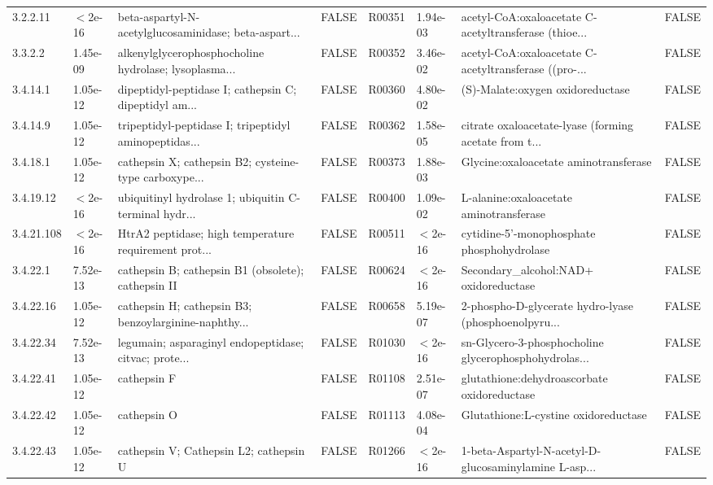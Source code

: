 \documentclass{article}\usepackage[]{graphicx}\usepackage[]{color}
\begin{document}
{{\begin{tabular}{llllllll}
  3.2.2.11 & $<$2e-16 & beta-aspartyl-N-acetylglucosaminidase; beta-aspart... & FALSE & R00351 &  1.94e-03 & acetyl-CoA:oxaloacetate C-acetyltransferase (thioe... & FALSE \\ 
  3.3.2.2 &  1.45e-09 & alkenylglycerophosphocholine hydrolase; lysoplasma... & FALSE & R00352 &  3.46e-02 & acetyl-CoA:oxaloacetate C-acetyltransferase ((pro-... & FALSE \\ 
  3.4.14.1 &  1.05e-12 & dipeptidyl-peptidase I; cathepsin C; dipeptidyl am... & FALSE & R00360 &  4.80e-02 & (S)-Malate:oxygen oxidoreductase & FALSE \\ 
  3.4.14.9 &  1.05e-12 & tripeptidyl-peptidase I; tripeptidyl aminopeptidas... & FALSE & R00362 &  1.58e-05 & citrate oxaloacetate-lyase (forming acetate from t... & FALSE \\ 
  3.4.18.1 &  1.05e-12 & cathepsin X; cathepsin B2; cysteine-type carboxype... & FALSE & R00373 &  1.88e-03 & Glycine:oxaloacetate aminotransferase & FALSE \\ 
  3.4.19.12 & $<$2e-16 & ubiquitinyl hydrolase 1; ubiquitin C-terminal hydr... & FALSE & R00400 &  1.09e-02 & L-alanine:oxaloacetate aminotransferase & FALSE \\ 
  3.4.21.108 & $<$2e-16 & HtrA2 peptidase; high temperature requirement prot... & FALSE & R00511 & $<$2e-16 & cytidine-5'-monophosphate phosphohydrolase & FALSE \\ 
  3.4.22.1 &  7.52e-13 & cathepsin B; cathepsin B1 (obsolete); cathepsin II & FALSE & R00624 & $<$2e-16 & Secondary\_alcohol:NAD+ oxidoreductase & FALSE \\ 
  3.4.22.16 &  1.05e-12 & cathepsin H; cathepsin B3; benzoylarginine-naphthy... & FALSE & R00658 &  5.19e-07 & 2-phospho-D-glycerate hydro-lyase (phosphoenolpyru... & FALSE \\ 
  3.4.22.34 &  7.52e-13 & legumain; asparaginyl endopeptidase; citvac; prote... & FALSE & R01030 & $<$2e-16 & sn-Glycero-3-phosphocholine glycerophosphohydrolas... & FALSE \\ 
  3.4.22.41 &  1.05e-12 & cathepsin F & FALSE & R01108 &  2.51e-07 & glutathione:dehydroascorbate oxidoreductase & FALSE \\ 
  3.4.22.42 &  1.05e-12 & cathepsin O & FALSE & R01113 &  4.08e-04 & Glutathione:L-cystine oxidoreductase & FALSE \\ 
  3.4.22.43 &  1.05e-12 & cathepsin V; Cathepsin L2; cathepsin U & FALSE & R01266 & $<$2e-16 & 1-beta-Aspartyl-N-acetyl-D-glucosaminylamine L-asp... & FALSE \\ 

\end{tabular}}}
\end{document}
